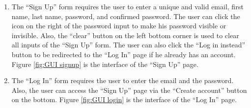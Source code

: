 \begin{enumerate}
  \item The ``Sign Up'' form requires the user to enter a unique and valid email, first name, last name, password, and confirmed password. The user can click the icon on the right of the password input to make his password visible or invisible. Also, the ``clear'' button on the left bottom corner is used to clear all inputs of the ``Sign Up'' form. The user can also click the ``Log in instead'' button to be redirected to the ``Log In'' page if he already has an account. Figure \ref{fig:GUI signup} is the interface of the ``Sign Up'' page.

  \item The ``Log In'' form requires the user to enter the email and the password. Also, the user can access the ``Sign Up'' page via the ``Create account'' button on the bottom. Figure \ref{fig:GUI login} is the interface of the ``Log In'' page.


\end{enumerate}
